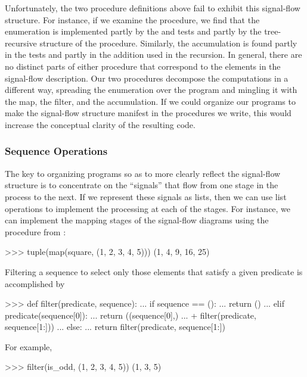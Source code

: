 Unfortunately, the two procedure definitions above fail to exhibit this
signal-flow structure.  For instance, if we examine the
 procedure, we find that the enumeration is implemented
partly by the  and  tests and partly by the
tree-recursive structure of the procedure.  Similarly, the accumulation is
found partly in the tests and partly in the addition used in the recursion.  In
general, there are no distinct parts of either procedure that correspond to the
elements in the signal-flow description.  Our two procedures decompose the
computations in a different way, spreading the enumeration over the program and
mingling it with the map, the filter, and the accumulation.  If we could
organize our programs to make the signal-flow structure manifest in the
procedures we write, this would increase the conceptual clarity of the
resulting code.

\subsubsection*{Sequence Operations}

The key to organizing programs so as to more clearly reflect the signal-flow
structure is to concentrate on the ``signals'' that flow from one stage in the
process to the next.  If we represent these signals as lists, then we can use
list operations to implement the processing at each of the stages.  For
instance, we can implement the mapping stages of the signal-flow diagrams using
the  procedure from :

\begin{codeBlock}
>>> tuple(map(square, (1, 2, 3, 4, 5)))
(1, 4, 9, 16, 25)
\end{codeBlock}

\noindent
Filtering a sequence to select only those elements that satisfy a given
predicate is accomplished by

\begin{codeBlock}
>>> def filter(predicate, sequence):
...     if sequence == ():
...         return ()
...     elif predicate(sequence[0]):
...         return ((sequence[0],)
...                 + filter(predicate, sequence[1:]))
...     else:
...         return filter(predicate, sequence[1:])
\end{codeBlock}

\noindent
For example,

\begin{codeBlock}
>>> filter(is_odd, (1, 2, 3, 4, 5))
(1, 3, 5)
\end{codeBlock}


